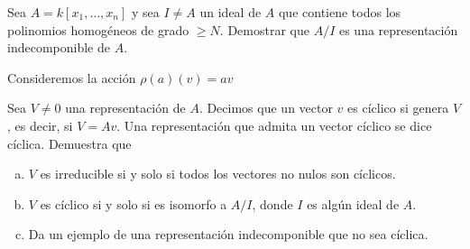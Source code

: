 \documentclass[twoside]{article}
\begin{document}
\newpage




\begin{ejercicio}{1.24}
Sea $A = k[x_1,\dotsc,x_n]$ y sea $I\neq A$ un ideal de $A$ que contiene todos los polinomios homogéneos de grado $\geq N$. Demostrar que $A/I$ es una representación indecomponible de $A$. 
\end{ejercicio}
\begin{solucion}
Consideremos la acción $\rho(a)(v) = av$ 
\end{solucion}


\newpage

\begin{ejercicio}{1.25}
Sea $V\neq 0$ una representación de $A$. Decimos que un vector $v$ es cíclico si genera $V$, es decir, si $V= Av$. Una representación que admita un vector cíclico se dice cíclica. Demuestra que
\begin{enumerate}[(a)]
\item $V$ es irreducible si y solo si todos los vectores no nulos son cíclicos.
\item $V$ es cíclico si y solo si es isomorfo a $A/I$, donde $I$ es algún ideal de $A$. 
\item Da un ejemplo de una representación indecomponible que no sea cíclica.

\end{enumerate}
\end{ejercicio}
\end{document}
